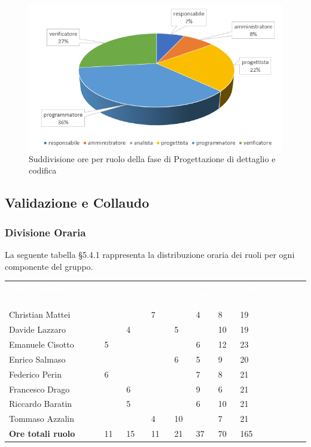 \begin{figure}[h]
	\centering
	\includegraphics[scale=2]{sezioni/Aerogrammi/AerogrammaDiDettaglio.png}
	\caption{Suddivisione ore per ruolo della fase di Progettazione di dettaglio e codifica}
\end{figure}

\subsection{Validazione e Collaudo}

\subsubsection{Divisione Oraria}
La seguente tabella §5.4.1 rappresenta la distribuzione oraria dei ruoli per ogni componente del gruppo.
{
	\renewcommand{\arraystretch}{2}
	\centering
	\begin{longtable}{ C{5cm} C{1cm} C{1cm} C{1cm} C{1cm} C{1cm} C{1cm} C{3cm}}
		\textcolor{white}{\textbf{Nome membro del gruppo}} & \textcolor{white}{\textbf{RE}} & \textcolor{white}{\textbf{AM}} & \textcolor{white}{\textbf{AN}} & \textcolor{white}{\textbf{PT}} & \textcolor{white}{\textbf{PR}} & \textcolor{white}{\textbf{VE}} & \textcolor{white}{\textbf{Ore complessive}}\\	
        
        Christian Mattei & & & 7 & & 4 & 8 & 19\\
        Davide Lazzaro & & 4 & & 5 & & 10 & 19\\
        Emanuele Cisotto & 5 & & & & 6 & 12 & 23\\ 
        Enrico Salmaso & & & & 6 & 5 & 9 & 20 \\
        Federico Perin & 6 & & & & 7 & 8 & 21\\
        Francesco Drago & & 6 & & & 9 & 6 & 21\\
        Riccardo Baratin & & 5 & & & 6 & 10 & 21\\
        Tommaso Azzalin & & & 4 & 10 & & 7 & 21\\
        \textbf{Ore totali ruolo} & 11 & 15 & 11 & 21 & 37 & 70 & 165\\
		
	\end{longtable}
}


